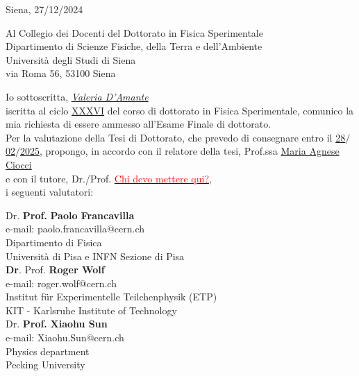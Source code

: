 \documentclass[12pt,a4paper,oneside]{extarticle}
\begin{document}
\pagestyle{default_page}
\begin{flushright}
Siena, 27/12/2024
\end{flushright}

Al Collegio dei Docenti del Dottorato in Fisica Sperimentale\\

Dipartimento di Scienze Fisiche, della Terra e dell'Ambiente\\

Università degli Studi di Siena\\

via Roma 56, 53100 Siena\\
\vspace{1cm}

\noindent Io sottoscritta, \textit{\underline{Valeria D'Amante}}\\

\noindent iscritta al ciclo \underline{XXXVI} del corso di dottorato in Fisica Sperimentale, comunico la mia richiesta di essere ammesso all'Esame Finale di dottorato.\\

\noindent Per la valutazione della Tesi di Dottorato, che prevedo di consegnare entro il \underline{28}$/$\underline{02}$/$\underline{2025}, propongo, in accordo con il relatore della tesi, Prof.ssa \underline{Maria Agnese Ciocci}\\

\noindent e con il tutore, Dr./Prof. \underline{\textcolor{red}{Chi devo mettere qui?}},\\

\noindent i seguenti valutatori:\\
\vspace{1cm}

\noindent \makebox[0pt][l]{$\square$}{ } \hspace{2mm}Dr. \/ \makebox[0pt][l]{$\square$}{$\times$} \textbf{Prof.} \textbf{Paolo Francavilla}\\
e-mail: paolo.francavilla@cern.ch \\
Dipartimento di Fisica \\
Università di Pisa e INFN Sezione di Pisa\\

\vspace{1cm}
\noindent\makebox[0pt][l]{$\square$}{$\times$}\textbf{Dr}. \/ \makebox[0pt][l]{$\square$}{ } \hspace{2mm} Prof. \textbf{Roger Wolf}\\
e-mail: roger.wolf@cern.ch \\
Institut für Experimentelle Teilchenphysik (ETP) \\
KIT - Karlsruhe Institute of Technology \\

\vspace{1cm}
\noindent \makebox[0pt][l]{$\square$}{ } \hspace{2mm} Dr. \/ \makebox[0pt][l]{$\square$}{$\times$} \textbf{Prof.} \textbf{Xiaohu Sun}\\
e-mail: Xiaohu.Sun@cern.ch\\
Physics department \\
Pecking University \\
\end{document}
